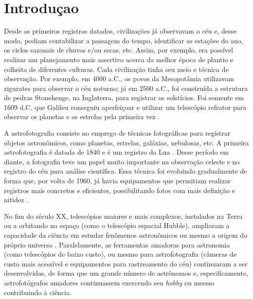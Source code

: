 \chapter{Introduçao}

Desde os primeiros registros datados, civilizações já observavam o céu e, desse modo, podiam contabilizar a passagem do tempo, identificar as estações do ano, os ciclos sazonais de chuvas e/ou secas, etc. Assim, por exemplo, era possível realizar um planejamento mais assertivo acerca da melhor época de plantio e colheita de diferentes culturas. Cada civilização tinha seu meio e técnica de observação. Por exemplo, em 4000 a.C., os povos da Mesopotâmia utilizavam zigurates para observar o céu noturno; já em 2500 a.C., foi construída a estrutura de pedras Stonehenge, na Inglaterra, para registrar os solstícios. Foi somente em 1609 d.C. que Galileu conseguiu aperfeiçoar e utilizar um telescópio refrator para observar os planetas e as estrelas pela primeira vez \cite{site:brescolaAstrofoto}.

A astrofotografia consiste no emprego de técnicas fotográficas para registrar objetos astronômicos, como planetas, estrelas, galáxias, nebulosas, etc. A primeira astrofotografia é datada de 1840 e é um registro da Lua \cite{site:introCabau}. Desse período em diante, a fotografia teve um papel muito importante na observação celeste e no registro do céu para análise científica. Essa técnica foi evoluindo gradualmente de forma que, por volta de 1960, já havia equipamentos que permitiam realizar registros mais concretos e eficientes, possibilitando fotos com mais definição e nitidez \cite{site:importanciaAstroftoSantos}.

No fim do século XX, telescópios maiores e mais complexos, instalados na Terra ou a orbitando no espaço (como o telescópio espacial Hubble), ampliaram a capacidade da ciência em estudar fenômenos astronômicos ou mesmo a origem do próprio universo \cite{site:importanciaAstroftoSantos}.
Paralelamente, as ferramentas amadoras para astronomia (como telescópios de baixo custo), ou mesmo para astrofotografia (câmeras de custo mais acessível e equipamentos para rastreamento do céu) continuaram a ser desenvolvidas, de forma que um grande número de astrônomos e, especificamente, astrofotógrafos amadores continuassem exercendo seu \textit{hobby} ou mesmo contribuindo à ciência.

